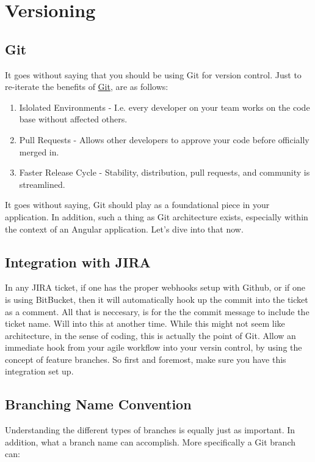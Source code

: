 \chapter{ Versioning }

\section { Git }
It goes without saying that you should be using Git for version control. Just to re-iterate the benefits of \href{https://git-scm.com/}{Git}, are as follows: 
\begin{enumerate} 
  \item Islolated Environments - I.e. every developer on your team works on the code base without affected others. 
  \item Pull Requests - Allows other developers to approve your code before officially merged in. 
  \item Faster Release Cycle - Stability, distribution, pull requests, and community is streamlined. 
\end{enumerate} 

It goes without saying, Git should play as a foundational piece in your application. In addition, such a thing as Git architecture exists, especially within the context of an Angular application. Let's dive into that now. 

\section { Integration with JIRA }
In any JIRA ticket, if one has the proper webhooks setup with Github, or if one
is using BitBucket, then it will automatically hook up the commit into the
ticket as a comment. All that is neccesary, is for the the commit message to include the ticket name. Will into this at another time. While this might not seem like architecture, in the sense of coding, this is actually the point of Git. Allow an immediate hook from your agile workflow into your versin control, by using the concept of feature branches. So first and foremost, make sure you have this integration set up. 

\section { Branching Name Convention }
Understanding the different types of branches is equally just as important. In addition, what a branch name can accomplish. More specifically a Git branch can:

